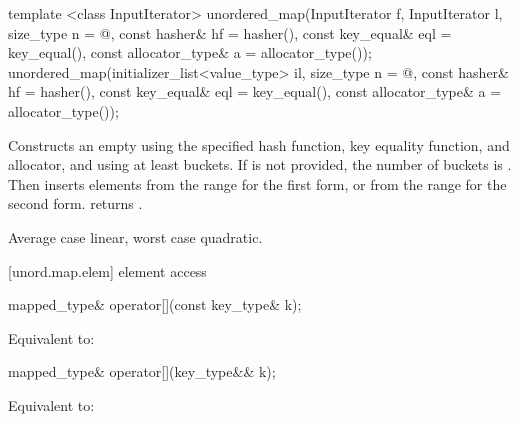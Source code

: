 %
\begin{itemdecl}
template <class InputIterator>
  unordered_map(InputIterator f, InputIterator l,
                size_type n = @\seebelow@,
                const hasher& hf = hasher(),
                const key_equal& eql = key_equal(),
                const allocator_type& a = allocator_type());
unordered_map(initializer_list<value_type> il,
              size_type n = @\seebelow@,
              const hasher& hf = hasher(),
              const key_equal& eql = key_equal(),
              const allocator_type& a = allocator_type());
\end{itemdecl}

\begin{itemdescr}
\pnum
\effects Constructs an empty  using the
specified hash function, key equality function, and allocator, and
using at least  buckets. If  is not
provided, the number of buckets is . Then
inserts elements from the range 
for the first form, or from the range
 for the second form.
 returns .

\pnum
\complexity Average case linear, worst case quadratic.
\end{itemdescr}

[unord.map.elem]{ element access}

%
%
%
\begin{itemdecl}
mapped_type& operator[](const key_type& k);
\end{itemdecl}

\begin{itemdescr}
\pnum
\effects Equivalent to: 
\end{itemdescr}

%
%
%
\begin{itemdecl}
mapped_type& operator[](key_type&& k);
\end{itemdecl}

\begin{itemdescr}
\pnum
\effects Equivalent to: 
\end{itemdescr}

